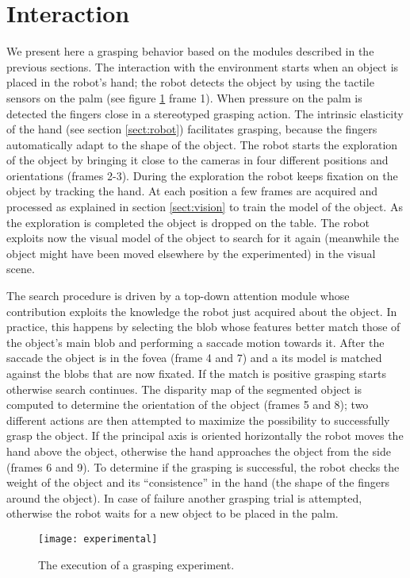 \section{Interaction}
\label{sect:exp}

We present here a grasping behavior based on the modules described in the previous sections. The interaction with the environment starts when an object is placed in the robot's hand; the robot detects the object by using the tactile sensors on the palm (see figure \ref{fig-experiment} frame 1). When pressure on the palm is detected the fingers close in a stereotyped grasping action. The intrinsic elasticity of the hand (see section \ref{sect:robot}) facilitates grasping, because the fingers automatically adapt to the shape of the object. The robot starts the exploration of the object by bringing it close to the cameras in four different positions and orientations (frames 2-3). During the exploration the robot keeps fixation on the object by tracking the hand. At each position a few frames are acquired and processed as explained in section \ref{sect:vision} to train the model of the object. As the exploration is completed the object is dropped on the table. The robot exploits now the visual model of the object to search for it again (meanwhile the object might have been moved elsewhere by the experimented) in the visual scene. 

The search procedure is driven by a top-down attention module whose contribution exploits the knowledge the robot just acquired about the object. In practice, this happens by selecting the blob whose features better match those of the object's main blob and performing a saccade motion towards it. After the saccade the object is in the fovea (frame 4 and 7) and a its model is matched against the blobs that are now fixated. If the match is positive grasping starts otherwise search continues. The disparity map of the segmented object is computed to determine the orientation of the object (frames 5 and 8); two different actions are then attempted to maximize the possibility to successfully grasp the object. If the principal axis is oriented horizontally the robot moves the hand above the object, otherwise the hand approaches the object from the side (frames 6 and 9). To determine if the grasping is successful, the robot checks the weight of the object and its ``consistence'' in the hand (the shape of the fingers around the object). In case of failure another grasping trial is attempted, otherwise the robot waits for a new object to be placed in the palm.

\begin{figure}
\centering
\texttt{[image: experimental]}
\caption{The execution of a grasping experiment.}
\label{fig-experiment}
\end{figure}
